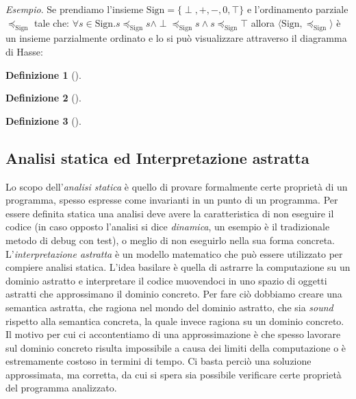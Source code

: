 \documentclass{article}
\theoremstyle{definition}
\newtheorem{definition}{Definizione}[section]
\theoremstyle{definition}
\newcommand{\simplePoset}[1]{\langle #1, \preceq_{#1}\rangle}
\begin{document}
\noindent\textit{Esempio}. Se prendiamo l'insieme \(\textrm{Sign}=\{\perp, +, -, 0, \top\}\) e l'ordinamento parziale \(\preceq_{\textrm{Sign}}\) tale che: \(\forall s \in \textrm{Sign}. s \preceq_{\textrm{Sign}} s \wedge \perp \preceq_{\textrm{Sign}} s \wedge s \preceq_{\textrm{Sign}} \top\) allora \(\simplePoset{\textrm{Sign}}\) è un insieme parzialmente ordinato e lo si può visualizzare attraverso il diagramma di Hasse:

\begin{center}


\end{center}

\begin{definition}[]
\end{definition}

\begin{definition}[]
\end{definition}

\begin{definition}[]
\end{definition}

\subsection{Analisi statica ed Interpretazione astratta}

Lo scopo dell'\textit{analisi statica} è quello di provare formalmente certe proprietà di un programma, spesso espresse come invarianti in un punto di un programma. Per essere definita statica una analisi deve avere la caratteristica di non eseguire il codice (in caso opposto l'analisi si dice \textit{dinamica}, un esempio è il tradizionale metodo di debug con test), o meglio di non eseguirlo nella sua forma concreta. L'\textit{interpretazione astratta} è un modello matematico che può essere utilizzato per compiere analisi statica. L'idea basilare è quella di astrarre la computazione su un dominio astratto e interpretare il codice muovendoci in uno spazio di oggetti astratti che approssimano il dominio concreto. Per fare ciò dobbiamo creare una semantica astratta, che ragiona nel mondo del dominio astratto, che sia \textit{sound} rispetto alla semantica concreta, la quale invece ragiona su un dominio concreto. Il motivo per cui ci accontentiamo di una approssimazione è che spesso lavorare sul dominio concreto risulta impossibile a causa dei limiti della computazione o è estremamente costoso in termini di tempo. Ci basta perciò una soluzione approssimata, ma corretta, da cui si spera sia possibile verificare certe proprietà del programma analizzato.
\end{document}
